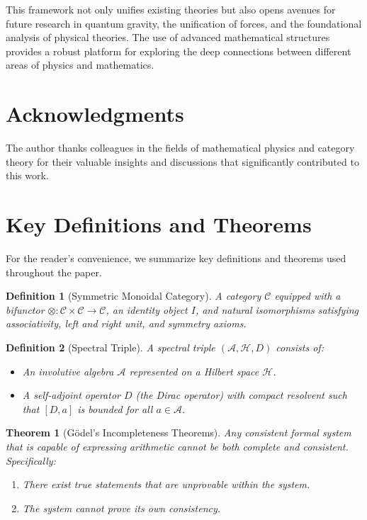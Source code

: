 \documentclass[12pt]{article}
\newtheorem{definition}{Definition}[section]
\newtheorem{theorem}{Theorem}[section]
\begin{document}
This framework not only unifies existing theories but also opens avenues for future research in quantum gravity, the unification of forces, and the foundational analysis of physical theories. The use of advanced mathematical structures provides a robust platform for exploring the deep connections between different areas of physics and mathematics.

\section*{Acknowledgments}

The author thanks colleagues in the fields of mathematical physics and category theory for their valuable insights and discussions that significantly contributed to this work.

\appendix

\section{Key Definitions and Theorems}

For the reader's convenience, we summarize key definitions and theorems used throughout the paper.

\begin{definition}[Symmetric Monoidal Category]
A category $\mathcal{C}$ equipped with a bifunctor $\otimes: \mathcal{C} \times \mathcal{C} \rightarrow \mathcal{C}$, an identity object $I$, and natural isomorphisms satisfying associativity, left and right unit, and symmetry axioms.
\end{definition}

\begin{definition}[Spectral Triple]
A spectral triple $(\mathcal{A}, \mathcal{H}, D)$ consists of:
\begin{itemize}
    \item An involutive algebra $\mathcal{A}$ represented on a Hilbert space $\mathcal{H}$.
    \item A self-adjoint operator $D$ (the Dirac operator) with compact resolvent such that $[D, a]$ is bounded for all $a \in \mathcal{A}$.
\end{itemize}
\end{definition}

\begin{theorem}[Gödel's Incompleteness Theorems]
Any consistent formal system that is capable of expressing arithmetic cannot be both complete and consistent. Specifically:
\begin{enumerate}[label=\arabic*.]
    \item There exist true statements that are unprovable within the system.
    \item The system cannot prove its own consistency.
\end{enumerate}
\end{theorem}
\end{document}
